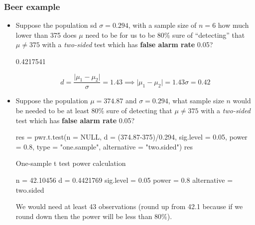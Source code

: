\documentclass[a4paper]{article}
\begin{document}
\subsubsection{Beer example}
\begin{itemize}
	\item Suppose the population sd \( \sigma = 0.294 \), with a sample size of \( n = 6 \) how much lower than 375 does \textcolor{myred}{\( \mu \)} need to be for us to be 80\% sure of ``detecting'' that \textcolor{myred}{\( \mu \neq 375 \)} with a \textit{two-sided} test which has \textbf{false alarm rate} 0.05?
\begin{Schunk}
\begin{Soutput}
[1] 0.4217541
\end{Soutput}
\end{Schunk}
\[
	d = \frac{\lvert \mu_1 - \mu_2 \rvert}{\sigma} = 1.43 \implies \lvert \mu_1 - \mu_2 \rvert = 1.43\sigma = 0.42
\]
	\item Suppose the population  \textcolor{myred}{\( \mu = 374.87 \)} and \( \sigma = 0.294 \), what sample size \( n \) would be needed to be at least 80\% sure of detecting that \( \mu \neq 375 \) with a \textit{two-sided} test which has \textbf{false alarm rate} 0.05?
\begin{Schunk}
\begin{Sinput}
res = pwr.t.test(n = NULL,
                 d = (374.87-375)/0.294, 
                 sig.level = 0.05,
                 power = 0.8, 
                 type = "one.sample", 
                 alternative = "two.sided")
res
\end{Sinput}
\begin{Soutput}

     One-sample t test power calculation 

              n = 42.10456
              d = 0.4421769
      sig.level = 0.05
          power = 0.8
    alternative = two.sided
\end{Soutput}
\end{Schunk}
We would need at least 43 observations (round up from 42.1 because if we round down then the power will be less than 80\%).
\end{itemize}
\end{document}
